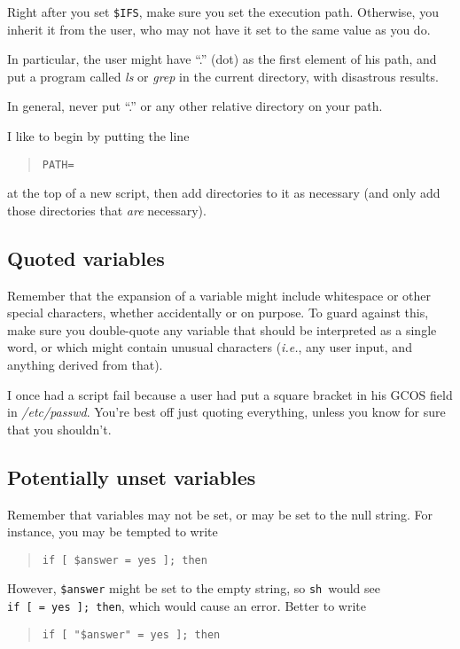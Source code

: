 \documentclass{article}
\newcommand{\fname}[1]{\textsl{#1}}
\newcommand{\code}[1]{\texttt{#1}}
\newcommand{\sh}{\code{sh}}
\begin{document}
	Right after you set \code{\$IFS}, make sure you set the
execution path. Otherwise, you inherit it from the user, who may not
have it set to the same value as you do.

	In particular, the user might have ``.'' (dot) as the first
element of his path, and put a program called \fname{ls} or
\fname{grep} in the current directory, with disastrous results.

	In general, never put ``.'' or any other relative directory on
your path.

	I like to begin by putting the line
\begin{quote}
\begin{verbatim}
PATH=
\end{verbatim}
\end{quote}
at the top of a new script, then add directories to it as necessary
(and only add those directories that \emph{are} necessary).

\subsection{Quoted variables}

	Remember that the expansion of a variable might include
whitespace or other special characters, whether accidentally or on
purpose. To guard against this, make sure you double-quote any
variable that should be interpreted as a single word, or which might
contain unusual characters (\textit{i.e.}, any user input, and
anything derived from that).

	I once had a script fail because a user had put a square
bracket in his GCOS field in \fname{/etc/passwd}. You're best off just
quoting everything, unless you know for sure that you shouldn't.

\subsection{Potentially unset variables}

	Remember that variables may not be set, or may be set to the
null string. For instance, you may be tempted to write
\begin{quote}
\begin{verbatim}
if [ $answer = yes ]; then
\end{verbatim}%
\end{quote}

\begin{sloppy}
	However, \code{\$answer} might be set to the empty string, so
\sh\ would see \code{if~[~=~yes~]; then}, which would cause an error.
Better to write
\begin{quote}
\begin{verbatim}
if [ "$answer" = yes ]; then
\end{verbatim}%
\end{quote}
\end{sloppy}
\end{document}
